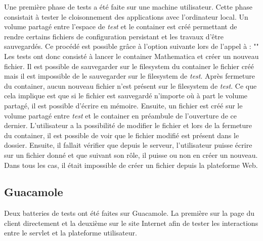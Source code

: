 Une première phase de tests a été faite sur une machine utilisateur.
Cette phase consistait à tester le cloisonnement des applications avec l'ordinateur local.
Un volume partagé entre l'espace de \textit{test} et le container est créé permettant de rendre certains fichiers de configuration persistant et les travaux d'être sauvegardés.
Ce procédé est possible grâce à l'option suivante lors de l'appel à  : ""
\newline 
Les tests ont donc consisté à lancer le container Mathematica et créer un nouveau fichier.
Il est possible de sauvegarder sur le filesystem du container le fichier créé mais il est impossible de le sauvegarder sur le filesystem de \textit{test}.
Après fermeture du container, aucun nouveau fichier n'est présent sur le \gls{filesystem} de \textit{test}.
Ce que cela implique est que si le fichier est sauvegardé  n'importe où à part le volume partagé, il est possible d'écrire en mémoire.
\newline 
Ensuite, un fichier est créé sur le volume partagé entre \textit{test} et le container en préambule de l'ouverture de ce dernier.
L'utilisateur a la possibilité de modifier le fichier et lors de la fermeture du container, il est possible de voir que le fichier modifié est présent dans le dossier.
\newline
Ensuite, il fallait vérifier que depuis le serveur, l'utilisateur puisse écrire sur un fichier donné et que suivant son rôle, il puisse ou non en créer un nouveau.
Dans tous les cas, il était impossible de créer un fichier depuis la plateforme Web.

\subsection{Guacamole}
Deux batteries de tests ont été faites sur Guacamole.
La première sur la page du client directement et la deuxième sur le site Internet afin de tester les interactions entre le servlet et la plateforme utilisateur.
